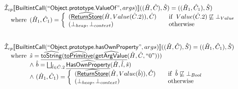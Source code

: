 \documentclass{article}
\newcommand{\SF}[1]{\mbox{\textsf{#1}}}
\newcommand{\wherec}[1]{{\rm where}\begin{array}[t]{l}#1\end{array}}
\newcommand{\ifc}[1]{{\rm if}\begin{array}[t]{l}#1\end{array}}
\newcommand{\owc}{{\rm otherwise}}
\newcommand{\aI}{\hat{\mathcal{I}}}
\newcommand{\lbr}{\llbracket}
\newcommand{\rbr}{\rrbracket}
\newcommand{\ahf}[1]{\widehat{\underline{\sf #1}}}
\begin{document}
\[\begin{array}{l}
\aI _{cp}\lbr \SF{BuiltintCall}(``\SF{Object.prototype.ValueOf}",args)\rbr((\hat{H},\hat{C}), \hat{S})  = ((\hat{H}_1, \hat{C}_1), \hat{S})\\
\quad\wherec{
  (\hat{H}_1, \hat{C}_1) = 
    \left\{\begin{array}{l@{\quad\quad}l}
      (\ahf{ReturnStore}(\hat{H}, Value(\hat{C}.2)), \hat{C})
      & \ifc{Value(\hat{C}.2) \not\sqsubseteq \bot_{Value}}\\
      (\bot_{heap}, \bot_{context}) & \owc \\
    \end{array}\right.\\    
  }\\
\\\\
  
  
\aI _{cp}\lbr \SF{BuiltintCall}(``\SF{Object.prototype.hasOwnProperty}",args)\rbr((\hat{H},\hat{C}), \hat{S})  = ((\hat{H}_1, \hat{C}_1), \hat{S})\\
\quad\wherec{
  \hat{s} = \ahf{toString}(\ahf{toPrimitive}(\ahf{getArgValue}(\hat{H}, \hat{C}, ``0")))\\
  \land\ \hat{b} = \bigsqcup_{\hat{l} \in \hat{C}.2} \ahf{HasOwnProperty}(\hat{H}, \hat{l}, \hat{s})\\
  \land\ (\hat{H}_1, \hat{C}_1) = 
    \left\{\begin{array}{l@{\quad\quad}l}
      (\ahf{ReturnStore}(\hat{H}, Value(\hat{b})), \hat{C})
      & \ifc{\hat{b} \not\sqsubseteq \bot_{Bool}}\\
      (\bot_{heap}, \bot_{context}) & \owc \\
    \end{array}\right.\\
  }\\
\\\\




\end{array}\]
\end{document}
